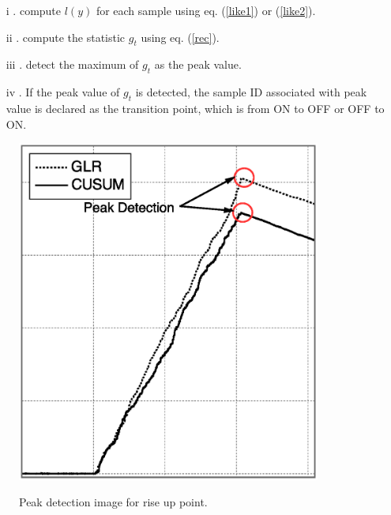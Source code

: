\begin{enumerate}
  \item[i]. compute $l(y)$ for each sample using eq. (\ref{like1}) or (\ref{like2}).
  \item[ii]. compute the statistic $g_t$ using eq. (\ref{rec}).
  \item[iii]. detect the maximum of $g_t$ as the peak value. 
  \item[iv]. If the peak value of $g_t$ is detected, the sample ID associated with peak value is declared as the transition point, which is from ON to OFF or OFF to ON.
\end{enumerate}

\begin{center}
  \begin{figure}[!htp]
    \centering
    \includegraphics[width=100mm]{peak_OFF2ON.eps}
    \label{peak_OFF2ON}
    \caption{Peak detection image for rise up point.}
  \end{figure}
\end{center} 

